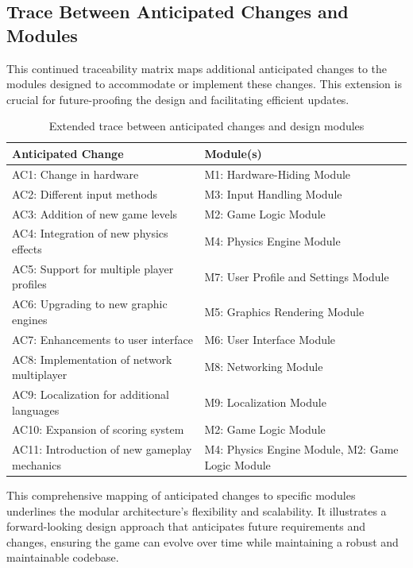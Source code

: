 \documentclass[12pt]{article}
\begin{document}
\subsection{Trace Between Anticipated Changes and Modules}

This continued traceability matrix maps additional anticipated changes to the modules designed to accommodate or implement these changes. This extension is crucial for future-proofing the design and facilitating efficient updates.

\begin{table}[H]
\centering
\begin{tabular}{|l|l|}
\hline
\textbf{Anticipated Change} & \textbf{Module(s)} \\ \hline
AC1: Change in hardware & M1: Hardware-Hiding Module \\ \hline
AC2: Different input methods & M3: Input Handling Module \\ \hline
AC3: Addition of new game levels & M2: Game Logic Module \\ \hline
AC4: Integration of new physics effects & M4: Physics Engine Module \\ \hline
AC5: Support for multiple player profiles & M7: User Profile and Settings Module \\ \hline
AC6: Upgrading to new graphic engines & M5: Graphics Rendering Module \\ \hline
AC7: Enhancements to user interface & M6: User Interface Module \\ \hline
AC8: Implementation of network multiplayer & M8: Networking Module \\ \hline
AC9: Localization for additional languages & M9: Localization Module \\ \hline
AC10: Expansion of scoring system & M2: Game Logic Module \\ \hline
AC11: Introduction of new gameplay mechanics & M4: Physics Engine Module, M2: Game Logic Module \\ \hline
\end{tabular}
\caption{Extended trace between anticipated changes and design modules}
\end{table}

This comprehensive mapping of anticipated changes to specific modules underlines the modular architecture's flexibility and scalability. It illustrates a forward-looking design approach that anticipates future requirements and changes, ensuring the game can evolve over time while maintaining a robust and maintainable codebase.
\end{document}
